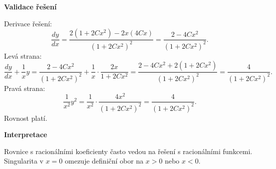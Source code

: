 \begin{example}
\noindent\textbf{Validace řešení}

Derivace řešení:
\[
\frac{dy}{dx} = \frac{2(1 + 2Cx^2) - 2x(4Cx)}{(1 + 2Cx^2)^2} = \frac{2 - 4Cx^2}{(1 + 2Cx^2)^2}.
\]
Levá strana:
\[
\frac{dy}{dx} + \frac{1}{x}y = \frac{2 - 4Cx^2}{(1 + 2Cx^2)^2} + \frac{1}{x} \cdot \frac{2x}{1 + 2Cx^2} = \frac{2 - 4Cx^2 + 2(1 + 2Cx^2)}{(1 + 2Cx^2)^2} = \frac{4}{(1 + 2Cx^2)^2}.
\]
Pravá strana:
\[
\frac{1}{x^2} y^2 = \frac{1}{x^2} \cdot \frac{4x^2}{(1 + 2Cx^2)^2} = \frac{4}{(1 + 2Cx^2)^2}.
\]
Rovnost platí.

\vspace{1.5\baselineskip}

\noindent\textbf{Interpretace}

Rovnice s racionálními koeficienty často vedou na řešení s racionálními funkcemi. Singularita v $x = 0$ omezuje definiční obor na $x > 0$ nebo $x < 0$.

\end{example}


